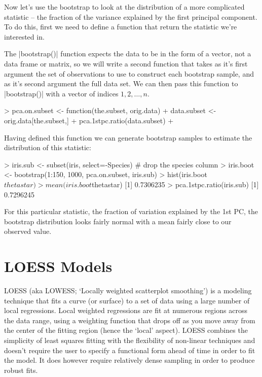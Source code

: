 Now let's use the bootstrap to look at the distribution of a more complicated statistic -- the fraction of the variance explained by the first principal component.  To do this, first we need to define a function that return the statistic we're interested in.
%
%
The |bootstrap()| function expects the data to be in the form of a vector, not a data frame or matrix, so we will write a second function that takes as it's first argument the set of observations to use to construct each bootstrap sample, and as it's second argument the full data set.  We can then pass this function to |bootstrap()| with a vector of indices $1,2,\ldots,n$.
%
\begin{R}
> pca.on.subset <- function(the.subset, orig.data){
+     data.subset <- orig.data[the.subset,]
+     pca.1stpc.ratio(data.subset)
+ }

\end{R}

Having defined this function we can generate bootstrap samples to estimate the distribution of this statistic:
%
\begin{R}
> iris.sub <- subset(iris, select=-Species)  # drop the species column
> iris.boot <- bootstrap(1:150, 1000, pca.on.subset, iris.sub)
> hist(iris.boot$thetastar)
> mean(iris.boot$thetastar)
[1] 0.7306235
> pca.1stpc.ratio(iris.sub)
[1] 0.7296245
\end{R}
%
For this particular statistic, the fraction of variation explained by the 1st PC, the bootstrap distribution looks fairly normal with a mean fairly close to our observed value. 

\section{LOESS Models}

LOESS (aka LOWESS; `Locally weighted scatterplot smoothing') is a
modeling technique that fits a curve (or surface) to a set of data using
a large number of local regressions. Local weighted regressions are fit
at numerous regions across the data range, using a weighting function
that drops off as you move away from the center of the fitting region
(hence the `local' aspect). LOESS combines the simplicity of least
squares fitting with the flexibility of non-linear techniques and
doesn't require the user to specify a functional form ahead of time in
order to fit the model. It does however require relatively dense
sampling in order to produce robust fits.


